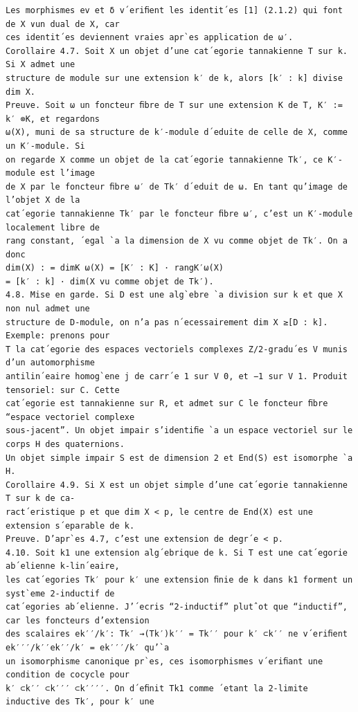 \documentclass[10pt]{article}
\begin{document}
\begin{verbatim}
Les morphismes ev et δ v´eriﬁent les identit´es [1] (2.1.2) qui font de X ∨un dual de X, car
ces identit´es deviennent vraies apr`es application de ω′.
Corollaire 4.7. Soit X un objet d’une cat´egorie tannakienne T sur k. Si X admet une
structure de module sur une extension k′ de k, alors [k′ : k] divise dim X.
Preuve. Soit ω un foncteur ﬁbre de T sur une extension K de T, K′ := k′ ⊗K, et regardons
ω(X), muni de sa structure de k′-module d´eduite de celle de X, comme un K′-module. Si
on regarde X comme un objet de la cat´egorie tannakienne Tk′, ce K′-module est l’image
de X par le foncteur ﬁbre ω′ de Tk′ d´eduit de ω. En tant qu’image de l’objet X de la
cat´egorie tannakienne Tk′ par le foncteur ﬁbre ω′, c’est un K′-module localement libre de
rang constant, ´egal `a la dimension de X vu comme objet de Tk′. On a donc
dim(X) : = dimK ω(X) = [K′ : K] · rangK′ω(X)
= [k′ : k] · dim(X vu comme objet de Tk′).
4.8. Mise en garde. Si D est une alg`ebre `a division sur k et que X non nul admet une
structure de D-module, on n’a pas n´ecessairement dim X ≥[D : k]. Exemple: prenons pour
T la cat´egorie des espaces vectoriels complexes Z/2-gradu´es V munis d’un automorphisme
antilin´eaire homog`ene j de carr´e 1 sur V 0, et −1 sur V 1. Produit tensoriel: sur C. Cette
cat´egorie est tannakienne sur R, et admet sur C le foncteur ﬁbre “espace vectoriel complexe
sous-jacent”. Un objet impair s’identiﬁe `a un espace vectoriel sur le corps H des quaternions.
Un objet simple impair S est de dimension 2 et End(S) est isomorphe `a H.
Corollaire 4.9. Si X est un objet simple d’une cat´egorie tannakienne T sur k de ca-
ract´eristique p et que dim X < p, le centre de End(X) est une extension s´eparable de k.
Preuve. D’apr`es 4.7, c’est une extension de degr´e < p.
4.10. Soit k1 une extension alg´ebrique de k. Si T est une cat´egorie ab´elienne k-lin´eaire,
les cat´egories Tk′ pour k′ une extension ﬁnie de k dans k1 forment un syst`eme 2-inductif de
cat´egories ab´elienne. J’´ecris “2-inductif” plutˆot que “inductif”, car les foncteurs d’extension
des scalaires ek′′/k′: Tk′ →(Tk′)k′′ = Tk′′ pour k′ ⊂k′′ ne v´eriﬁent ek′′′/k′′ek′′/k′ = ek′′′/k′ qu’`a
un isomorphisme canonique pr`es, ces isomorphismes v´eriﬁant une condition de cocycle pour
k′ ⊂k′′ ⊂k′′′ ⊂k′′′′. On d´eﬁnit Tk1 comme ´etant la 2-limite inductive des Tk′, pour k′ une


\end{verbatim}
\end{document}
